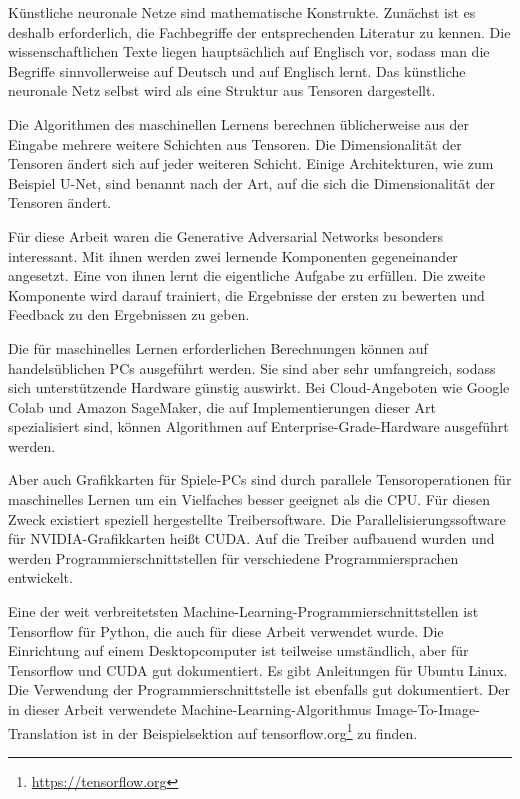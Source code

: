 Künstliche neuronale Netze sind mathematische Konstrukte. Zunächst ist es deshalb erforderlich, die Fachbegriffe der entsprechenden Literatur zu kennen. Die wissenschaftlichen Texte liegen hauptsächlich auf Englisch vor, sodass man die Begriffe sinnvollerweise auf Deutsch und auf Englisch lernt. Das künstliche neuronale Netz selbst wird als eine Struktur aus Tensoren dargestellt.

Die Algorithmen des maschinellen Lernens berechnen üblicherweise aus der Eingabe mehrere weitere Schichten aus Tensoren. Die Dimensionalität der Tensoren ändert sich auf jeder weiteren Schicht. Einige Architekturen, wie zum Beispiel U-Net, sind benannt nach der Art, auf die sich die Dimensionalität der Tensoren ändert.

Für diese Arbeit waren die Generative Adversarial Networks besonders interessant. Mit ihnen werden zwei lernende Komponenten gegeneinander angesetzt. Eine von ihnen lernt die eigentliche Aufgabe zu erfüllen. Die zweite Komponente wird darauf trainiert, die Ergebnisse der ersten zu bewerten und Feedback zu den Ergebnissen zu geben.

Die für maschinelles Lernen erforderlichen Berechnungen können auf handelsüblichen PCs ausgeführt werden. Sie sind aber sehr umfangreich, sodass sich unterstützende Hardware günstig auswirkt. Bei Cloud-Angeboten wie Google Colab und Amazon SageMaker, die auf Implementierungen dieser Art spezialisiert sind, können Algorithmen auf Enterprise-Grade-Hardware ausgeführt werden.

Aber auch Grafikkarten für Spiele-PCs sind durch parallele Tensoroperationen für maschinelles Lernen um ein Vielfaches besser geeignet als die CPU. Für diesen Zweck existiert speziell hergestellte Treibersoftware. Die Parallelisierungssoftware für NVIDIA-Grafikkarten heißt CUDA. Auf die Treiber aufbauend wurden und werden Programmierschnittstellen für verschiedene Programmiersprachen entwickelt.

Eine der weit verbreitetsten Machine-Learning-Programmierschnittstellen ist Tensorflow für Python, die auch für diese Arbeit verwendet wurde. Die Einrichtung auf einem Desktopcomputer ist teilweise umständlich, aber für Tensorflow und CUDA gut dokumentiert. Es gibt Anleitungen für Ubuntu Linux. Die Verwendung der Programmierschnittstelle ist ebenfalls gut dokumentiert. Der in dieser Arbeit verwendete Machine-Learning-Algorithmus Image-To-Image-Translation ist in der Beispielsektion auf tensorflow.org\footnote{\href{https://tensorflow.org}{https://tensorflow.org}} zu finden.

